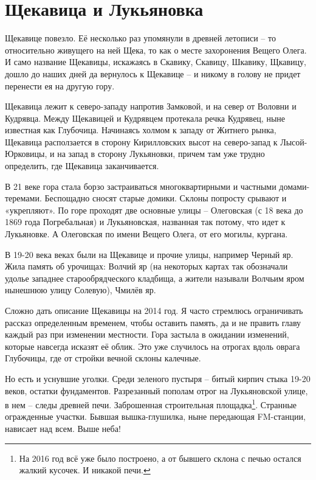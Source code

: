 \chapter{Щекавица и Лукьяновка}

Щекавице повезло. Её несколько раз упомянули в древней летописи – то относительно живущего на ней Щека, то как о месте захоронения Вещего Олега. И само название Щекавицы, искажаясь в Скавику, Скавицу, Шкавику, Щкавицу, дошло до наших дней да вернулось к Щекавице – и никому в голову не придет перенести ея на другую гору.

Щекавица лежит к северо-западу напротив Замковой, и на север от Воловни и Кудрявца. Между Щекавицей и Кудрявцем протекала речка Кудрявец, ныне известная как Глубочица. Начинаясь холмом к западу от Житнего рынка, Щекавица расползается в сторону Кирилловских высот на северо-запад к Лысой-Юрковицы, и на запад в сторону Лукьяновки, причем там уже трудно определить, где Щекавица заканчивается.

В 21 веке гора стала борзо застраиваться многоквартирными и частными домами-теремами. Беспощадно сносят старые домики. Склоны попросту срывают и «ук\-репляют». По горе проходят две основные улицы – Олеговская (с 18 века до 1869 года Погребальная) и Лукьяновская, названная так потому, что идет к Лукьяновке. А Олеговская по имени Вещего Олега, от его могилы, кургана.

В 19-20 века веках были на Щекавице и прочие улицы, например Черный яр. Жила память об урочищах: Волчий яр (на некоторых картах так обозначали удолье западнее старообрядческого кладбища, а жители называли Волчьим яром нынешнюю улицу Солевую), Чмилёв яр.

Сложно дать описание Щекавицы на 2014 год. Я часто стремлюсь ограничивать рассказ определенным временем, чтобы оставить память, да и не править главу каждый раз при изменении местности. Гора застыла в ожидании изменений, которые навсегда исказят её облик. Это уже случилось на отрогах вдоль оврага Глубочицы, где от стройки вечной склоны калечные.

Но есть и уснувшие уголки. Среди зеленого пустыря – битый кирпич стыка 19-20 веков, остатки фундаментов. Разрезанный пополам отрог на Лукьяновской улице, в нем – следы древней печи. Заброшенная строительная площадка\footnote{На 2016 год всё уже было построено, а от бывшего склона с печью остался жалкий кусочек. И никакой печи.}. Странные огражденные участки. Бывшая вышка-глушилка, ныне передающая FM-станции, нависает над всем. Выше неба!


